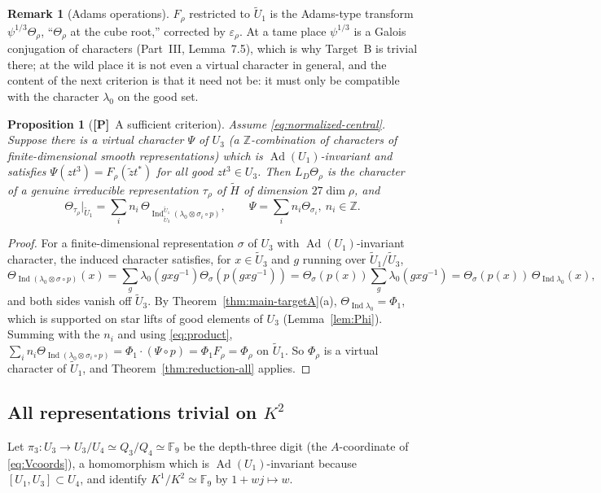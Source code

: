 \documentclass[11pt]{article}
\newcommand{\Z}{\mathbb Z}
\newcommand{\Fq}{\mathbb F}
\newcommand{\Ind}{\operatorname{Ind}}
\newcommand{\Ad}{\operatorname{Ad}}
\newcommand{\tH}{\widetilde H}
\newcommand{\tU}{\widetilde U}
\newcommand{\Ptag}{\textnormal{\textbf{[P]}}}
\theoremstyle{plain}
\newtheorem{proposition}[theorem]{Proposition}
\theoremstyle{definition}
\newtheorem{remark}[theorem]{Remark}
\begin{document}
\begin{remark}[Adams operations]
$F_\rho$ restricted to $\tU_1$ is the Adams-type transform
$\psi^{1/3}\Theta_\rho$, ``$\Theta_\rho$ at the cube root,'' corrected by
$\varepsilon_\rho$.  At a tame place $\psi^{1/3}$ is a Galois conjugation
of characters (Part~III, Lemma~7.5), which is why Target~B is trivial
there; at the wild place it is not even a virtual character in general,
and the content of the next criterion is that it need not be: it must
only be compatible with the character $\lambda_0$ on the good set.
\end{remark}

\begin{proposition}[\Ptag\ A sufficient criterion]\label{prop:criterion}
Assume \eqref{eq:normalized-central}.  Suppose there is a virtual
character $\Psi$ of $U_3$ (a $\Z$-combination of characters of
finite-dimensional smooth representations) which is $\Ad(U_1)$-invariant
and satisfies $\Psi(zt^3)=F_\rho(\tilde zt^*)$ for all good $zt^3\in U_3$.
Then $L_D\Theta_\rho$ is the character of a genuine irreducible
representation $\tau_\rho$ of $\tH$ of dimension $27\dim\rho$, and
\begin{equation}\label{eq:tau-rho}
 \Theta_{\tau_\rho}|_{\tU_1}=\sum_i n_i\,\Theta_{\Ind_{\tU_3}^{\tU_1}(\lambda_0\otimes\sigma_i\circ p)},
 \qquad \Psi=\sum_i n_i\Theta_{\sigma_i},\ n_i\in\Z .
\end{equation}
\end{proposition}
\begin{proof}
For a finite-dimensional representation $\sigma$ of $U_3$ with
$\Ad(U_1)$-invariant character, the induced character satisfies, for
$x\in\tU_3$ and $g$ running over $\tU_1/\tU_3$,
\[
 \Theta_{\Ind(\lambda_0\otimes\sigma\circ p)}(x)=\sum_g\lambda_0(gxg^{-1})\Theta_\sigma(p(gxg^{-1}))
 =\Theta_\sigma(p(x))\sum_g\lambda_0(gxg^{-1})=\Theta_\sigma(p(x))\,\Theta_{\Ind\lambda_0}(x),
\]
and both sides vanish off $\tU_3$.  By Theorem~\ref{thm:main-targetA}(a),
$\Theta_{\Ind\lambda_0}=\Phi_1$, which is supported on star lifts of good
elements of $U_3$ (Lemma~\ref{lem:Phi}).  Summing with the $n_i$ and
using \eqref{eq:product}, $\sum_in_i\Theta_{\Ind(\lambda_0\otimes\sigma_i\circ p)}=\Phi_1\cdot(\Psi\circ p)=\Phi_1F_\rho=\Phi_\rho$
on $\tU_1$.  So $\Phi_\rho$ is a virtual character of $\tU_1$, and
Theorem~\ref{thm:reduction-all} applies.
\end{proof}

\subsection{All representations trivial on $K^2$}
Let $\pi_3:U_3\to U_3/U_4\simeq Q_3/Q_4\simeq\Fq_9$ be the depth-three
digit (the $A$-coordinate of \eqref{eq:Vcoords}), a homomorphism which
is $\Ad(U_1)$-invariant because $[U_1,U_3]\subset U_4$, and identify
$K^1/K^2\simeq\Fq_9$ by $1+wj\mapsto w$.
\end{document}
